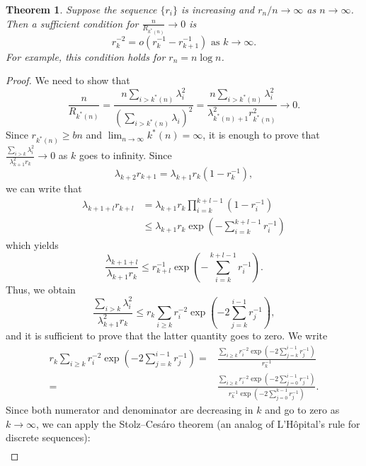 \documentclass[11pt,notitlepage]{article}
\newtheorem{theorem}{Theorem}
\begin{document}
	\begin{theorem}
          \label{t:third_term_suff}
		Suppose the sequence $\{r_i\}$ is increasing and $r_n/n \to \infty$ as $n \to \infty$. Then a sufficient condition for $	\frac{n}{R_{k^\ast(n)}} \to 0$ is 
		\[
		r_k^{-2} = o(r_k^{-1} - r_{k+1}^{-1}) \text{ as } k \to \infty.
		\]
		For example, this condition holds for $r_n = n\log n$.
	\end{theorem}
	\begin{proof}
		We need to show that 
		\[
		\frac{n}{R_{k^\ast(n)}} = \frac{n\sum_{i > k^\ast(n)}\lambda_i^2}{\left(\sum_{i > k^\ast(n)}\lambda_i\right)^2} = \frac{n\sum_{i > k^\ast(n)}\lambda_i^2}{\lambda_{k^\ast(n)+1}^2r_{k^\ast(n)}^2} \to 0.
		\]
		Since $r_{k^\ast(n)} \geq bn$
                and $\lim_{n \rightarrow \infty} k^*(n) = \infty$, 
                it is enough to prove
                that $\frac{\sum_{i >
                    k}\lambda_i^2}{\lambda_{k+1}^2r_{k}} \to 0$ as $k$
                goes to infinity.
                Since 
		\[
		\lambda_{k+2} r_{k+1} =  \lambda_{k+1}r_k(1 - r_k^{-1}),
		\]
		we can write that
                \begin{align*}
		 \lambda_{k+1+l}r_{k+l} & =  \lambda_{k+1}r_k\prod_{i = k}^{k+l-1} (1-r_{i}^{-1}) \\
               & \leq \lambda_{k+1}r_k \exp\left(-\sum_{i=k}^{k+l-1}r_{i}^{-1}\right)
                \end{align*}
                which yields
		\[
                \frac{\lambda_{k+1+l}}{\lambda_{k+1}r_k}
		 \leq r_{k+l}^{-1} \exp\left(-\sum_{i=k}^{k+l-1}r_{i}^{-1}\right).
		\]
		Thus, we obtain
		\[
		\frac{\sum_{i > k}\lambda_i^2}{\lambda_{k+1}^2r_{k}}\leq
		r_k\sum_{i \geq k} r_{i}^{-2}\exp\left(-2\sum_{j=k}^{i-1}r_{j}^{-1}\right),
		\]
		and it is sufficient to prove that the latter quantity goes to zero. We write
		\begin{align*}
		 r_k\sum_{i \geq k} r_{i}^{-2}\exp\left(-2\sum_{j=k}^{i-1}r_{j}^{-1}\right) =& \frac{\sum_{i \geq k} r_{i}^{-2}\exp\left(-2\sum_{j=k}^{i-1}r_{j}^{-1}\right)}{r_k^{-1}}\\
		 =&\frac{\sum_{i \geq k} r_{i}^{-2}\exp\left(-2\sum_{j=0}^{i-1}r_{j}^{-1}\right)}{r_k^{-1}\exp\left(-2\sum_{j=0}^{k-1}r_{j}^{-1}\right)}.
		 \end{align*}
		 Since both numerator and denominator are decreasing in $k$ and go to zero as $k \to \infty$, we can apply the Stolz–Ces\'{a}ro theorem (an analog of L'H\^{o}pital's rule for discrete sequences):
		\begin{align*}

\end{align*}
\end{proof}
\end{document}
